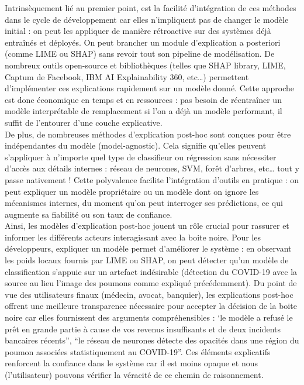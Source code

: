 \documentclass{article}
\begin{document}
    Intrinsèquement lié au premier point, est la facilité d’intégration de ces méthodes dans le cycle de développement car elles n’impliquent pas de changer le modèle initial : on peut les appliquer de manière rétroactive sur des systèmes déjà entraînés et déployés. On peut brancher un module d’explication a posteriori (comme LIME ou SHAP) sans revoir tout son pipeline de modélisation. De nombreux outils open-source et bibliothèques (telles que SHAP library, LIME, Captum de Facebook, IBM AI Explainability 360, etc…) permettent d’implémenter ces explications rapidement sur un modèle donné. Cette approche est donc économique en temps et en ressources : pas besoin de réentraîner un modèle interprétable de remplacement si l’on a déjà un modèle performant, il suffit de l’entourer d’une couche explicative.\\
    
    De plus, de nombreuses méthodes d’explication post-hoc sont conçues pour être indépendantes du modèle (model-agnostic). Cela signifie qu’elles peuvent s’appliquer à n’importe quel type de classifieur ou régression sans nécessiter d’accès aux détails internes : réseau de neurones, SVM, forêt d’arbres, etc… tout y passe nativement ! Cette polyvalence facilite l’intégration d’outils en pratique : on peut expliquer un modèle propriétaire ou un modèle dont on ignore les mécanismes internes, du moment qu’on peut interroger ses prédictions, ce qui augmente sa fiabilité ou son taux de confiance.\\
    
    Ainsi, les modèles d’explication post-hoc jouent un rôle crucial pour rassurer et informer les différents acteurs interagissant avec la boite noire. Pour les développeurs, expliquer un modèle permet d’améliorer le système : en observant les poids locaux fournis par LIME ou SHAP, on peut détecter qu’un modèle de classification s’appuie sur un artefact indésirable (détection du COVID-19 avec la source au lieu l’image des poumons comme expliqué précédemment). Du point de vue des utilisateurs finaux (médecin, avocat, banquier), les explications post-hoc offrent une meilleure transparence nécessaire pour accepter la décision de la boite noire car elles fournissent des arguments compréhensibles : ‘le modèle a refusé le prêt en grande partie à cause de vos revenus insuffisants et de deux incidents bancaires récents”, “le réseau de neurones détecte des opacités dans une région du poumon associées statistiquement au COVID-19”. Ces éléments explicatifs renforcent la confiance dans le système car il est moins opaque et nous (l’utilisateur) pouvons vérifier la véracité de ce chemin de raisonnement.
\end{document}
